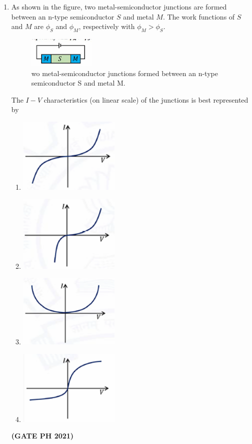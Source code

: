 \documentclass[14pt, a4paper]{extarticle}
\begin{document}
\begin{enumerate}[label=\textbf{Q.\arabic*}]
\begin{enumerate}[label=\textbf{Q.\arabic*}]
\item As shown in the figure, two metal-semiconductor junctions are formed between an n-type semiconductor $S$ and metal $M$. The work functions of $S$ and $M$ are $\phi_S$ and $\phi_M$, respectively with $\phi_M > \phi_S$.
\begin{figure}[H]
\centering
\includegraphics[width=0.3\textwidth]{figs/q4fig21.png}
\caption{wo metal-semiconductor junctions formed
between an n-type semiconductor S and metal M.}
\end{figure}
The $I-V$ characteristics (on linear scale) of the junctions is best represented by
\begin{enumerate}
\item \includegraphics[width=0.4\textwidth]{figs/q14figa21.png}
\item \includegraphics[width=0.4\textwidth]{figs/q14figb21.png}
\item \includegraphics[width=0.4\textwidth]{figs/q14figc21.png}
\item \includegraphics[width=0.4\textwidth]{figs/q14figd21.png}
\end{enumerate}
\hfill \textbf{(GATE PH 2021)}


\end{enumerate}
\end{enumerate}
\end{document}
